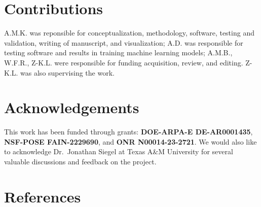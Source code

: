 \documentclass[
]{article}
\begin{document}
\hypertarget{contributions}{%
\section{Contributions}\label{contributions}}

A.M.K. was reponsible for conceptualization, methodology, software,
testing and validation, writing of manuscript, and visualization; A.D.
was responsible for testing software and results in training machine
learning models; A.M.B., W.F.R., Z-K.L. were responsible for funding
acquisition, review, and editing. Z-K.L. was also supervising the work.

\hypertarget{acknowledgements}{%
\section{Acknowledgements}\label{acknowledgements}}

This work has been funded through grants: \textbf{DOE-ARPA-E
DE-AR0001435}, \textbf{NSF-POSE FAIN-2229690}, and \textbf{ONR
N00014-23-2721}. We would also like to acknowledge Dr.~Jonathan Siegel
at Texas A\&M University for several valuable discussions and feedback
on the project.

\hypertarget{references}{%
\section*{References}\label{references}}
\end{document}
